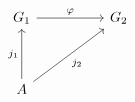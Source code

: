 \[\begin{tikzcd}
	{G_{1}} && {G_{2}} \\
	\\
	A
	\arrow["{j_{1}}", from=3-1, to=1-1]
	\arrow["{j_{2}}"', from=3-1, to=1-3]
	\arrow["\varphi", from=1-1, to=1-3]
\end{tikzcd}\]